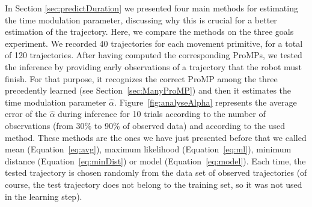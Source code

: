 \documentclass[utf8]{frontiersSCNS} %
\begin{document}
In Section \ref{sec:predictDuration} we presented four main methods for estimating the time modulation parameter, discussing why this is crucial for a better estimation of the trajectory. 
Here, we compare the methods on the three goals experiment.
We recorded 40 trajectories for each movement primitive, 
for a total of 120 trajectories.
After having computed the corresponding ProMPs, we tested the inference by providing early observations of a trajectory that the robot must finish. For that purpose, it recognizes the correct ProMP among the three precedently learned (see Section~\ref{sec:ManyProMP}) and then it estimates the time modulation parameter $\hat{\alpha}$.
Figure~\ref{fig:analyseAlpha} represents the average error of the $\hat{\alpha}$ during inference for 10 trials according to the number of observations (from 30\% to 90\% of observed data) and according to the used method. 
These methods are the ones we have just presented before that we called mean (Equation~\ref{eq:avg}), maximum likelihood (Equation~\ref{eq:ml}), minimum distance (Equation~\ref{eq:minDist}) or model (Equation~\ref{eq:model}). 
Each time, the tested trajectory is chosen randomly from the data set of observed trajectories (of course, the test trajectory does not belong to the training set, so it was not used in the learning step). 
\end{document}
